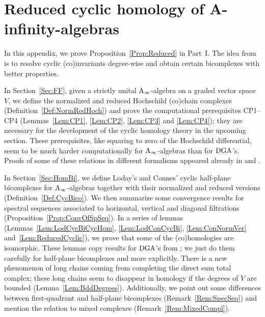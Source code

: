 \documentclass[\MainFolder/Text.tex]{subfiles}
\begin{document}
\chapter{Reduced cyclic homology of A-infinity-algebras}

In this appendix, we prove Proposition~\ref{Prop:Reduced} in Part~I. The idea from \cite{LodayCyclic} is to resolve cyclic (co)invariants degree-wise and obtain certain bicomplexes with better properties.

In Section~\ref{Sec:FF}, given a strictly unital $\mathrm{A}_\infty$-algebra on a graded vector space $V$, we define the normalized and reduced Hochschild (co)chain complexes (Definition~\ref{Def:NormRedHoch}) and prove the computational prerequisites CP1--CP4 (Lemmas~\ref{Lem:CP1}, \ref{Lem:CP2}, \ref{Lem:CP3} and \ref{Lem:CP4}); they are necessary for the development of the cyclic homology theory in the upcoming section. These prerequisites, like squaring to zero of the Hochschild differential, seem to be much harder computationally for $\mathrm{A}_\infty$-algebras than for $\mathrm{DGA}$'s. Proofs of some of these relations in different formalisms appeared already in \cite{Mescher2016} and \cite{Lazarev2003}.

In Section~\ref{Sec:HomBi}, we define Loday's and Connes' cyclic half-plane bicomplexes for $\mathrm{A}_\infty$-algebras together with their normalized and reduced versions (Definition~\ref{Def:CycBico}). We then summarize some convergence results for spectral sequences associated to horizontal, vertical and diagonal filtrations (Proposition~\ref{Prop:ConvOfSpSeq}). In a series of lemmas (Lemmas~\ref{Lem:LodCycBiCycHom}, \ref{Lem:LodConCycBi}, \ref{Lem:ConNormVer} and~\ref{Lem:ReducedCyclic}), we prove that some of the (co)homologies are isomorphic. These lemmas copy results for $\mathrm{DGA}$'s from \cite{LodayCyclic}; we just do them carefully for half-plane bicomplexes and more explicitly. There is a new phenomenon of long chains coming from completing the direct sum total complex; these long chains seem to disappear in homology if the degrees of $V$ are bounded (Lemma~\ref{Lem:BddDegrees}). Additionally, we point out some differences between first-quadrant and half-plane bicomplexes (Remark~\ref{Rem:SpecSeq}) and mention the relation to mixed complexes (Remark~\ref{Rem:MixedCompl}).
\end{document}
